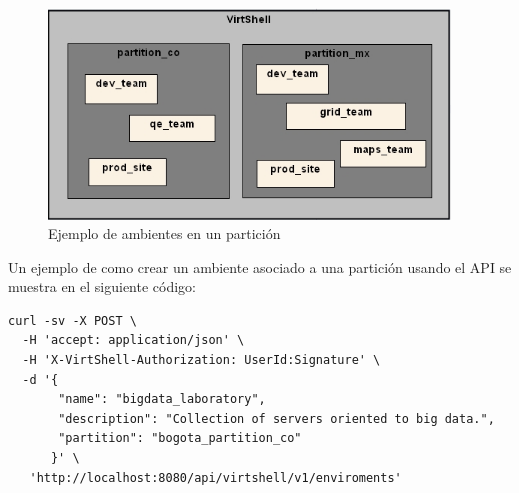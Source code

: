\vspace{5mm}

\begin{figure}[h]
    \centering
  \caption{Ejemplo de ambientes en un partición}
  \label{fig:enviroment}
  \includegraphics[width = 0.95\textwidth]{../architecture/v1/diagrams/enviroments}
\end{figure}

\vspace{5mm}

Un ejemplo de como crear un ambiente asociado a una partición usando el API se muestra en el siguiente código:

\vspace{4cm}

\begin{lstlisting}[style=json, caption=Petición HTTP para crear un ambiente]
curl -sv -X POST \
  -H 'accept: application/json' \
  -H 'X-VirtShell-Authorization: UserId:Signature' \
  -d '{
       "name": "bigdata_laboratory",
       "description": "Collection of servers oriented to big data.", 
       "partition": "bogota_partition_co"
      }' \
   'http://localhost:8080/api/virtshell/v1/enviroments'
\end{lstlisting}


